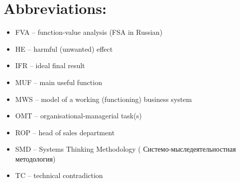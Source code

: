 \documentclass[11pt,a4paper]{book}
\begin{document}
\section{Abbreviations:}
\begin{itemize}
\item FVA -- function-value analysis (FSA in Russian)
\item HE -- harmful (unwanted) effect
\item IFR -- ideal final result
\item MUF -- main useful function
\item MWS -- model of a working (functioning) business system
\item OMT -- organisational-managerial task(s)
\item ROP -- head of sales department
\item SMD -- Systems Thinking Methodology
 ( \foreignlanguage{russian}{Системо-мыследеятельностная методология})
\item TC -- technical contradiction
\end{itemize}
\end{document}
